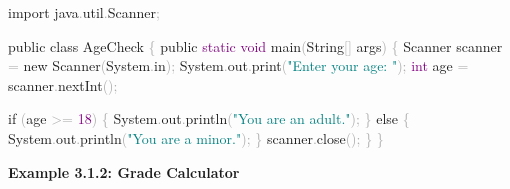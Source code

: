 \documentclass[
  justified,
  openright,
]{tufte-book}
\newcommand{\BuiltInTok}[1]{#1}
\newcommand{\ControlFlowTok}[1]{\textcolor{BrandBlue}{#1}}
\newcommand{\DataTypeTok}[1]{\textcolor{Purple}{#1}}
\newcommand{\DecValTok}[1]{\textcolor{Purple}{#1}}
\newcommand{\FunctionTok}[1]{\textcolor{BrandBlue}{#1}}
\newcommand{\ImportTok}[1]{\textcolor{BrandAccent}{#1}}
\newcommand{\KeywordTok}[1]{\textcolor{BrandBlue}{#1}}
\newcommand{\NormalTok}[1]{#1}
\newcommand{\OperatorTok}[1]{\textcolor{DarkGray}{#1}}
\newcommand{\StringTok}[1]{\textcolor{Teal}{#1}}
\newenvironment{Shaded}{%
  \begin{snugshade}
}{%
  \end{snugshade}
}
\begin{document}
\begin{Shaded}
\begin{Highlighting}[]
\KeywordTok{import} \ImportTok{java}\OperatorTok{.}\ImportTok{util}\OperatorTok{.}\ImportTok{Scanner}\OperatorTok{;}

\KeywordTok{public} \KeywordTok{class}\NormalTok{ AgeCheck }\OperatorTok{\{}
    \KeywordTok{public} \DataTypeTok{static} \DataTypeTok{void} \FunctionTok{main}\OperatorTok{(}\BuiltInTok{String}\OperatorTok{[]}\NormalTok{ args}\OperatorTok{)} \OperatorTok{\{}
        \BuiltInTok{Scanner}\NormalTok{ scanner }\OperatorTok{=} \KeywordTok{new} \BuiltInTok{Scanner}\OperatorTok{(}\BuiltInTok{System}\OperatorTok{.}\FunctionTok{in}\OperatorTok{);}
        \BuiltInTok{System}\OperatorTok{.}\FunctionTok{out}\OperatorTok{.}\FunctionTok{print}\OperatorTok{(}\StringTok{"Enter your age: "}\OperatorTok{);}
        \DataTypeTok{int}\NormalTok{ age }\OperatorTok{=}\NormalTok{ scanner}\OperatorTok{.}\FunctionTok{nextInt}\OperatorTok{();}

        \ControlFlowTok{if} \OperatorTok{(}\NormalTok{age }\OperatorTok{\textgreater{}=} \DecValTok{18}\OperatorTok{)} \OperatorTok{\{}
            \BuiltInTok{System}\OperatorTok{.}\FunctionTok{out}\OperatorTok{.}\FunctionTok{println}\OperatorTok{(}\StringTok{"You are an adult."}\OperatorTok{);}
        \OperatorTok{\}} \ControlFlowTok{else} \OperatorTok{\{}
            \BuiltInTok{System}\OperatorTok{.}\FunctionTok{out}\OperatorTok{.}\FunctionTok{println}\OperatorTok{(}\StringTok{"You are a minor."}\OperatorTok{);}
        \OperatorTok{\}}
\NormalTok{        scanner}\OperatorTok{.}\FunctionTok{close}\OperatorTok{();}
    \OperatorTok{\}}
\OperatorTok{\}}
\end{Highlighting}
\end{Shaded}

\textbf{Example 3.1.2: Grade Calculator}
\end{document}
